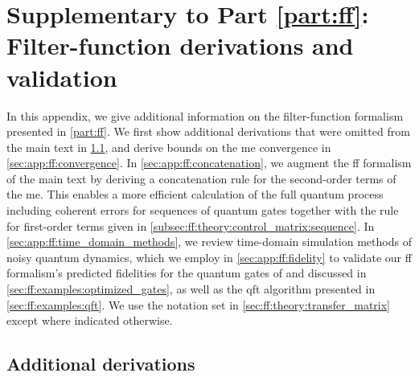 \setchapterpreamble[u]{\margintoc}
\chapter{Supplementary to Part \ref{part:ff}: Filter-function derivations and validation}\label{ch:app:ff}
In this appendix, we give additional information on the filter-function formalism presented in \cref{part:ff}.
We first show additional derivations that were omitted from the main text in \cref{sec:app:ff:derivations}, and derive bounds on the \gls{me} convergence in  \cref{sec:app:ff:convergence}.
In \cref{sec:app:ff:concatenation}, we augment the \gls{ff} formalism of the main text by deriving a concatenation rule for the second-order terms of the \gls{me}.
This enables a more efficient calculation of the full quantum process including coherent errors for sequences of quantum gates together with the rule for first-order terms given in \cref{subsec:ff:theory:control_matrix:sequence}.
In \cref{sec:app:ff:time_domain_methods}, we review time-domain simulation methods of noisy quantum dynamics, which we employ in \cref{sec:app:ff:fidelity} to validate our \gls{ff} formalism's predicted fidelities for the quantum gates of  and discussed in \cref{sec:ff:examples:optimized_gates}, as well as the \gls{qft} algorithm presented in \cref{sec:ff:examples:qft}.
We use the notation set in \cref{sec:ff:theory:transfer_matrix} except where indicated otherwise.

\section{Additional derivations}\label{sec:app:ff:derivations}
